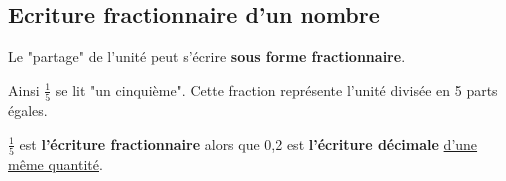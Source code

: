 		\subsection{Ecriture fractionnaire d'un nombre}
\begin{aconnaitre}
Le "partage" de l'unité peut s'écrire \textbf{sous forme fractionnaire}.

Ainsi $\frac{1}{5}$ se lit "un cinquième". Cette fraction représente l'unité divisée en 5 parts égales. \\

\begin{center}
\end{center}

$\frac{1}{5}$ est \textbf{l'écriture fractionnaire} alors que 0,2 est \textbf{l'écriture décimale} \underline{d'une même quantité}.
\end{aconnaitre}

